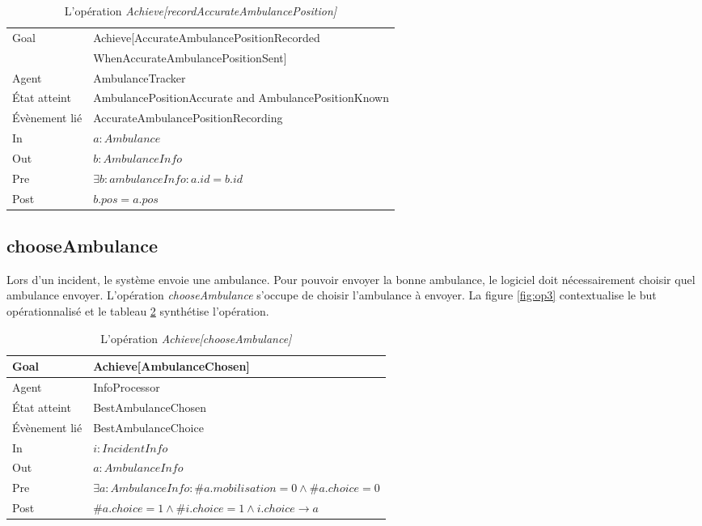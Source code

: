 	\begin{table}[!h] \centering
		\begin{tabularx}{\textwidth}{|l|X|} \hline
			Goal & Achieve[AccurateAmbulancePositionRecorded\\ &WhenAccurateAmbulancePositionSent] \\ \hline
			Agent & AmbulanceTracker \\ \hline
			État atteint & AmbulancePositionAccurate and AmbulancePositionKnown \\ \hline %
			Évènement lié & AccurateAmbulancePositionRecording \\ \hline
			In & $a: Ambulance$ \\ \hline
			Out & $b: AmbulanceInfo$ \\ \hline
			Pre & $\exists b: ambulanceInfo : a.id = b.id$ \\ \hline
			Post & $b.pos = a.pos$ \\ \hline
		\end{tabularx}
		\caption{L'opération \textit{Achieve[recordAccurateAmbulancePosition]}}\label{tab:op2}
	\end{table}

\subsection{chooseAmbulance}
	
	Lors d'un incident, le système envoie une ambulance. Pour pouvoir envoyer
	la bonne ambulance, le logiciel doit nécessairement choisir quel
	ambulance envoyer. L'opération \textit{chooseAmbulance} s'occupe de choisir
	l'ambulance à envoyer. La figure \ref{fig:op3} contextualise le but
	opérationnalisé et le tableau \ref{tab:op3} synthétise l'opération.
	
	
	\begin{table}[!h] \centering
		\begin{tabularx}{\textwidth}{|l|X|} \hline
			Goal & Achieve[AmbulanceChosen] \\ \hline
			Agent & InfoProcessor \\ \hline
			État atteint & BestAmbulanceChosen \\ \hline
			Évènement lié & BestAmbulanceChoice \\ \hline
			In & $i: IncidentInfo$ \\ \hline
			Out & $a: AmbulanceInfo$ \\ \hline
			Pre & $\exists a: AmbulanceInfo : \#a.mobilisation = 0 \wedge \#a.choice = 0$ \\ \hline
			Post & $\#a.choice = 1 \wedge \#i.choice = 1 \wedge i.choice \rightarrow a$ \\ \hline
		\end{tabularx}
		\caption{L'opération \textit{Achieve[chooseAmbulance]}}\label{tab:op3}
	\end{table}

